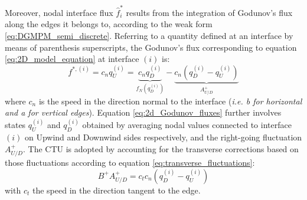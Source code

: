 Moreover, nodal interface flux $\hat{f}_i^{*}$ results from the integration of Godunov's flux along the edges it belongs to, according to the weak form \eqref{eq:DGMPM_semi_discrete}.
Referring to a quantity defined at an interface by means of parenthesis superscripts, the Godunov's flux corresponding to equation \eqref{eq:2D_model_equation} at interface $(i)$ is:
\begin{equation}
  \label{eq:2d_Godunov_fluxes}
  f^{*,(i)}= c_n q^{(i)}_U = \underbrace{c_nq^{(i)}_D}_{f_N(q^{(i)}_D)} - \underbrace{c_n (q^{(i)}_D -q^{(i)}_U)}_{A^{+}_{U/D}} 
\end{equation}
where $c_n$ is the speed in the direction normal to the interface (\textit{i.e. b for horizontal and a for vertical edges}). Equation \eqref{eq:2d_Godunov_fluxes} further involves states $q^{(i)}_U$ and $q^{(i)}_D$ obtained by averaging nodal values connected to interface $(i)$ on Upwind and Downwind sides respectively, and the right-going fluctuation $A_{U/D}^+$.
The CTU is adopted by accounting for the transverse corrections based on those fluctuations according to equation \eqref{eq:transverse_fluctuations}:
\begin{equation}
  \label{eq:2D_transverse_corrections}
  B^+A^+_{U/D}=c_t c_n (q^{(i)}_D -q^{(i)}_U)
\end{equation}
with $c_t$ the speed in the direction tangent to the edge. 
